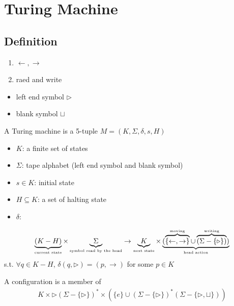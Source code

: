 \newpage
\section{Turing Machine}

\subsection{Definition}

\begin{enumerate}
    \item $\leftarrow, \rightarrow$
    \item raed and write
\end{enumerate}

\begin{itemize}
    \item left end symbol $\triangleright$
    \item blank symbol $\sqcup $
\end{itemize}

\begin{definition}
    A Turing machine is a 5-tuple $M=(K, \Sigma, \delta, s, H)$
    \begin{itemize}
        \item $K$: a finite set of states
        \item $\Sigma$: tape alphabet (left end symbol and blank symbol)
        \item $s\in K$: initial state
        \item $H\subseteq K$: a set of halting state
        \item $\delta$: 
    \end{itemize}
    \begin{align*}
        \underbrace{(K-H)}_{\text{\tiny current state}} \times \underbrace{\Sigma}_{\text{\tiny symbol read by the head}} \to \underbrace{K}_{\text{\tiny next state}} \times \underbrace{(\overbrace{\{ \leftarrow, \rightarrow \}}^{\text{\tiny moving}}\cup \overbrace{(\Sigma -\{ \triangleright  \})}^{\text{\tiny writing}})}_{\text{\tiny head action}}
    \end{align*}
    s.t. $\forall q\in K-H$, $\delta(q,\triangleright)=(p, \rightarrow)$ for some $p\in K$
\end{definition}

\begin{definition}[configuration]
    A configuration is a member of 
    \begin{align*}
        K \times \triangleright (\Sigma -\{ \triangleright \})^*\times \left(\{ e \}\cup (\Sigma -\{ \triangleright \})^*(\Sigma -\{ \triangleright, \sqcup\})\right)
    \end{align*}
\end{definition}


